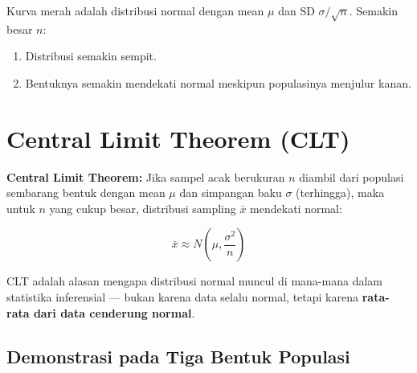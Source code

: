 \documentclass[
  indonesian,
  letterpaper,
]{book}
\providecommand{\tightlist}{%
  \setlength{\itemsep}{0pt}\setlength{\parskip}{0pt}}
\begin{document}
Kurva merah adalah distribusi normal dengan mean \(\mu\) dan SD
\(\sigma / \sqrt{n}\). Semakin besar \(n\):

\begin{enumerate}
\def\labelenumi{\arabic{enumi}.}
\tightlist
\item
  Distribusi semakin sempit.
\item
  Bentuknya semakin mendekati normal meskipun populasinya menjulur
  kanan.
\end{enumerate}

\section{Central Limit Theorem (CLT)}\label{central-limit-theorem-clt}

\textbf{Central Limit Theorem:} Jika sampel acak berukuran \(n\) diambil
dari populasi sembarang bentuk dengan mean \(\mu\) dan simpangan baku
\(\sigma\) (terhingga), maka untuk \(n\) yang cukup besar, distribusi
sampling \(\bar{x}\) mendekati normal:

\[\bar{x} \approx N\left(\mu, \frac{\sigma^2}{n}\right)\]

CLT adalah alasan mengapa distribusi normal muncul di mana-mana dalam
statistika inferensial --- bukan karena data selalu normal, tetapi
karena \textbf{rata-rata dari data cenderung normal}.

\subsection{Demonstrasi pada Tiga Bentuk
Populasi}\label{demonstrasi-pada-tiga-bentuk-populasi}
\end{document}

